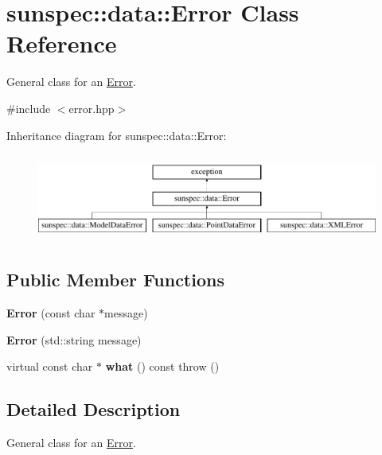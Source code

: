 \hypertarget{classsunspec_1_1data_1_1_error}{}\section{sunspec\+:\+:data\+:\+:Error Class Reference}
\label{classsunspec_1_1data_1_1_error}


General class for an \hyperlink{classsunspec_1_1data_1_1_error}{Error}.  




{\ttfamily \#include $<$error.\+hpp$>$}

Inheritance diagram for sunspec\+:\+:data\+:\+:Error\+:\begin{figure}[H]
\begin{center}
\leavevmode
\includegraphics[height=2.886598cm]{classsunspec_1_1data_1_1_error}
\end{center}
\end{figure}
\subsection*{Public Member Functions}
\begin{DoxyCompactItemize}
\item 
\mbox{\label{classsunspec_1_1data_1_1_error_a0c5db43f97b7381bb6bca9c2b3334766}} 
{\bfseries Error} (const char $\ast$message)
\item 
\mbox{\label{classsunspec_1_1data_1_1_error_a2ecfcff3fa5dfc445efd5d07c77c110c}} 
{\bfseries Error} (std\+::string message)
\item 
\mbox{\label{classsunspec_1_1data_1_1_error_a2f4d3b490105e2a46098e278061ae605}} 
virtual const char $\ast$ {\bfseries what} () const  throw ()
\end{DoxyCompactItemize}


\subsection{Detailed Description}
General class for an \hyperlink{classsunspec_1_1data_1_1_error}{Error}. 

